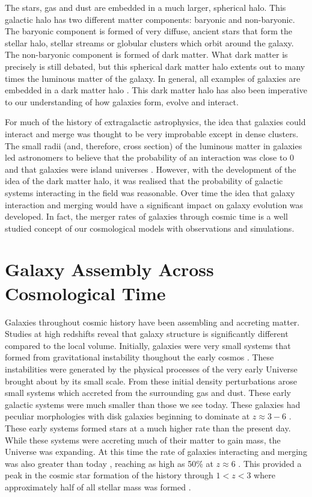 The stars, gas and dust are embedded in a much larger, spherical halo. This galactic halo has two different matter components: baryonic and non-baryonic. The baryonic component is formed of very diffuse, ancient stars that form the stellar halo, stellar streams or globular clusters which orbit around the galaxy. The non-baryonic component is formed of dark matter. What dark matter is precisely is still debated, but this spherical dark matter halo extents out to many times the luminous matter of the galaxy. In general, all examples of galaxies are embedded in a dark matter halo \cite[although there are some debated exceptions as described in][]{2018Natur.555..629V}. This dark matter halo has also been imperative to our understanding of how galaxies form, evolve and interact.

For much of the history of extragalactic astrophysics, the idea that galaxies could interact and merge was thought to be very improbable except in dense clusters. The small radii (and, therefore, cross section) of the luminous matter in galaxies led astronomers to believe that the probability of an interaction was close to 0 and that galaxies were island universes \citep{1926ApJ....64..321H}. However, with the development of the idea of the dark matter halo, it was realised that the probability of galactic systems interacting in the field was reasonable. Over time the idea that galaxy interaction and merging would have a significant impact on galaxy evolution was developed. In fact, the merger rates of galaxies through cosmic time is a well studied concept of our cosmological models with observations and simulations.

\section{Galaxy Assembly Across Cosmological Time}
\noindent Galaxies throughout cosmic history have been assembling and accreting matter. Studies at high redshifts reveal that galaxy structure is significantly different compared to the local volume. Initially, galaxies were very small systems that formed from gravitational instability thoughout the early cosmos \citep{1993MNRAS.262..627L}. These instabilities were generated by the physical processes of the very early Universe brought about by its small scale. From these initial density perturbations arose small systems which accreted from the surrounding gas and dust. These early galactic systems were much smaller than those we see today. These galaxies had peculiar morphologies \citep{2005ApJ...627..632E} with disk galaxies beginning to dominate at $z\approx3 - 6$ \citep{2022ApJ...938L...2F}. These early systems formed stars at a much higher rate than the present day. While these systems were accreting much of their matter to gain mass, the Universe was expanding. At this time the rate of galaxies interacting and merging was also greater than today \citep{2010ApJ...715..202H, 2011ApJ...742..103L}, reaching as high as 50\% at $z\approx6$ \citep{2009MNRAS.397..208C, 2009MNRAS.394L..51B}. This provided a peak in the cosmic star formation of the history through $1 < z < 3$ where approximately half of all stellar mass was formed \citep{2005ApJ...625..621B}.

